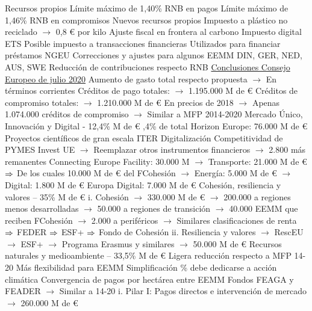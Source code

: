 \documentclass{nuevotema}
\begin{document}
\begin{esquemal}
				\4 Recursos propios
				\4[] Límite máximo de 1,40\% RNB en pagos
				\4[] Límite máximo de 1,46\% RNB en compromisos
				\4 Nuevos recursos propios
				\4[] Impuesto a plástico no reciclado
				\4[] $\to$ 0,8 € por kilo
				\4[] Ajuste fiscal en frontera al carbono
				\4[] Impuesto digital
				\4[] ETS
				\4[] Posible impuesto a transacciones financieras
				\4[] Utilizados para financiar préstamos NGEU
				\4 Correcciones y ajustes para algunos EEMM
				\4[] DIN, GER, NED, AUS, SWE
				\4[] Reducción de contribuciones respecto RNB
				\4[] \underline{Conclusiones Consejo Europeo de julio 2020}
				\4[] Aumento de gasto total respecto propuesta
				\4[] $\to$ En términos corrientes
				\4[] Créditos de pago totales:
				\4[] $\to$ 1.195.000 M de €
				\4[] Créditos de compromiso totales:
				\4[] $\to$ 1.210.000 M de €
				\4[] En precios de 2018
				\4[] $\to$ Apenas 1.074.000 créditos de compromiso
				\4[] $\to$ Similar a MFP 2014-2020
			\3[1] Mercado Único, Innovación y Digital - 12,4\%
				 M de €
				,4\% de total
				\4[] Horizon Europe: 76.000 M de €
				\4[] Proyectos científicos de gran escala
				\4[] ITER
				\4[] Digitalización
				\4[] Competitividad de PYMES
				\4[] Invest UE
				\4[] $\to$ Reemplazar otros instrumentos financieros
				\4[] $\to$ 2.800 más remanentes
				\4[] Connecting Europe Facility: 30.000 M
				\4[] $\to$ Transporte: 21.000 M de €
				\4[] $\Rightarrow$ De los cuales 10.000 M de € del FCohesión
				\4[] $\to$ Energía: 5.000 M de €
				\4[] $\to$ Digital: 1.800 M de €
				\4[] Europa Digital: 7.000 M de €
			\3[2] Cohesión, resiliencia y valores -- 35\%
				 M de €
				\4[] i. Cohesión
				\4[] $\to$ 330.000 M de €
				\4[] $\to$ 200.000 a regiones menos desarrolladas
				\4[] $\to$ 50.000 a regiones de transición
				\4[] $\to$ 40.000 EEMM que reciben FCohesión
				\4[] $\to$ 2.000 a periféricos
				\4[] $\to$ Similares clasificaciones de renta
				\4[] $\Rightarrow$ FEDER
				\4[] $\Rightarrow$ ESF+
				\4[] $\Rightarrow$ Fondo de Cohesión
				\4[] ii. Resiliencia y valores
				\4[] $\to$ RescEU
				\4[] $\to$ ESF+
				\4[] $\to$ Programa Erasmus y similares
				\4[] $\to$ 50.000 M de €
			\3[3] Recursos naturales y medioambiente -- 33,5\%
				 M de €
				\4[] Ligera reducción respecto a MFP 14-20
				\4[] Más flexibilidad para EEMM
				\4[] Simplificación
				\% debe dedicarse a acción climática
				\4[] Convergencia de pagos por hectárea entre EEMM
				\4[] Fondos FEAGA y FEADER
				\4[] $\to$ Similar a 14-20
				\4[] i. Pilar I: Pagos directos e intervención de mercado
				\4[] $\to$ 260.000 M de €

\end{esquemal}
\end{document}
